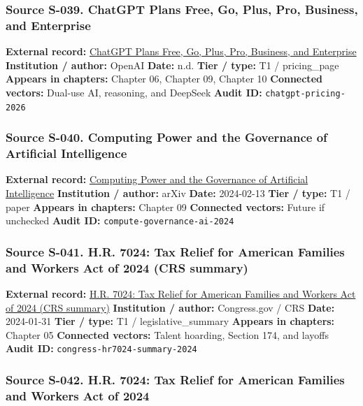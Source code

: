 \documentclass[
  american,
  11pt,
  letterpaper,
]{article}
\begin{document}
\subsubsection{Source S-039. ChatGPT Plans \textbar{} Free, Go, Plus,
Pro, Business, and
Enterprise}\label{source-s-039-chatgpt-plans-free-go-plus-pro-business-and-enterprise}

\textbf{External record:} \href{https://chatgpt.com/pricing/}{ChatGPT
Plans \textbar{} Free, Go, Plus, Pro, Business, and Enterprise}
\textbf{Institution / author:} OpenAI \textbf{Date:} n.d. \textbf{Tier /
type:} T1 / pricing\_page \textbf{Appears in chapters:} Chapter 06,
Chapter 09, Chapter 10 \textbf{Connected vectors:} Dual-use AI,
reasoning, and DeepSeek \textbf{Audit ID:} \texttt{chatgpt-pricing-2026}

\subsubsection{Source S-040. Computing Power and the Governance of
Artificial
Intelligence}\label{source-s-040-computing-power-and-the-governance-of-artificial-intelligence}

\textbf{External record:}
\href{https://arxiv.org/abs/2402.08797}{Computing Power and the
Governance of Artificial Intelligence} \textbf{Institution / author:}
arXiv \textbf{Date:} 2024-02-13 \textbf{Tier / type:} T1 / paper
\textbf{Appears in chapters:} Chapter 09 \textbf{Connected vectors:}
Future if unchecked \textbf{Audit ID:}
\texttt{compute-governance-ai-2024}

\subsubsection{Source S-041. H.R. 7024: Tax Relief for American Families
and Workers Act of 2024 (CRS
summary)}\label{source-s-041-h-r-7024-tax-relief-for-american-families-and-workers-act-of-2024-crs-summary}

\textbf{External record:}
\href{https://www.congress.gov/bill/118th-congress/house-bill/7024}{H.R.
7024: Tax Relief for American Families and Workers Act of 2024 (CRS
summary)} \textbf{Institution / author:} Congress.gov / CRS
\textbf{Date:} 2024-01-31 \textbf{Tier / type:} T1 /
legislative\_summary \textbf{Appears in chapters:} Chapter 05
\textbf{Connected vectors:} Talent hoarding, Section 174, and layoffs
\textbf{Audit ID:} \texttt{congress-hr7024-summary-2024}

\subsubsection{Source S-042. H.R. 7024: Tax Relief for American Families
and Workers Act of
2024}\label{source-s-042-h-r-7024-tax-relief-for-american-families-and-workers-act-of-2024}
\end{document}
